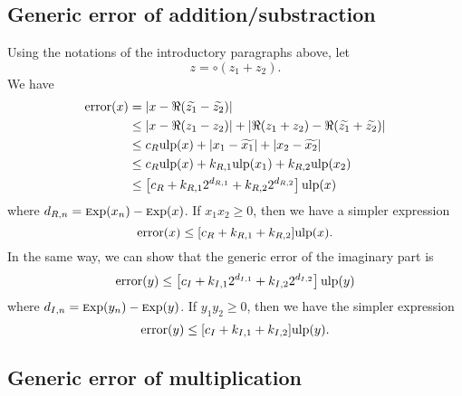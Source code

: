 \documentclass {article}
\newcommand {\Ulp}{{\rm ulp}}
\DeclareMathOperator{\error}{error}
\DeclareMathOperator{\Exp}{{\rm \textsc exp}}
\begin{document}
\subsection {Generic error of addition/substraction}

Using the notations of the introductory paragraphs above, let
\[
z=\circ(z_1+z_2).
\]
We have
\begin{align*}
\error(x)&= |x-\Re(\widetilde{z_1}-\widetilde{z_2})|
\\
&\leq |x-\Re(z_1-z_2)|+|\Re(z_1+z_2)-\Re(\widetilde{z_1}+\widetilde{z_2})|
\\
&\leq c_R\Ulp(x)+|x_1-\widetilde{x_1}|+|x_2-\widetilde{x_2}|
\\
&\leq c_R\Ulp(x)+k_{R,1}\Ulp(x_1)+k_{R,2}\Ulp(x_2)
\\
&\leq \left[c_R+k_{R,1}2^{d_{R,1}}+k_{R,2}2^{d_{R,2}}\right]\Ulp(x)
\end{align*}
where $d_{R,n}=\Exp(x_n)-\Exp(x)$. If $x_1x_2 \geq 0$, then we have a simpler
expression
\[
\error(x) \leq [c_R+k_{R,1}+k_{R,2}] \Ulp(x).
\]
In the same way, we can show that the generic error of the imaginary part is
\[
\error (y) \leq \left[c_I+k_{I,1}2^{d_{I,1}}+k_{I,2}2^{d_{I,2}}\right] \Ulp(y)
\]
where $d_{I,n}=\Exp(y_n)-\Exp(y)$. If $y_1y_2 \geq 0$, then we have the
simpler expression
\[
\error(y) \leq [c_I+k_{I,1}+k_{I,2}] \Ulp(y).
\]


\subsection {Generic error of multiplication}
\end{document}
